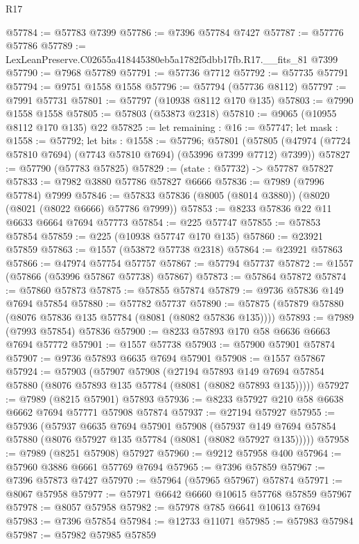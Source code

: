 \begin{lexlean}{R17}
\begin{coremodule}
@57784 := @57783 @7399
@57786 := @7396 @57784 @7427
@57787 := @57776 @57786
@57789 := LexLeanPreserve.C02655a418445380eb5a1782f5dbb17fb.R17.__fits_81 @7399
@57790 := @7968 @57789
@57791 := @57736 @7712
@57792 := @57735 @57791
@57794 := @9751 @1558 @1558
@57796 := @57794 (@57736 @8112)
@57797 := @7991 @57731
@57801 := @57797 (@10938 @8112 @170 @135)
@57803 := @7990 @1558 @1558
@57805 := @57803 (@53873 @2318)
@57810 := @9065 (@10955 @8112 @170 @135) @22
@57825 := let remaining : @16 := @57747;
  let mask : @1558 := @57792;
  let bits : @1558 := @57796;
  @57801 (@57805 (@47974 (@7724 @57810 @7694) (@7743 @57810 @7694) (@53996 @7399 @7712) @7399))
@57827 := @57790 (@57783 @57825)
@57829 := (state : @57732) -> @57787 @57827
@57833 := @7982 @3880 @57786 @57827 @6666
@57836 := @7989 (@7996 @57784) @7999
@57846 := @57833 @57836 (@8005 (@8014 @3880)) (@8020 (@8021 (@8022 @6666) @57786 @7999))
@57853 := @8233 @57836 @22 @11 @6633 @6664 @7694 @57773
@57854 := @225 @57747
@57855 := @57853 @57854
@57859 := @225 (@10938 @57747 @170 @135)
@57860 := @23921 @57859
@57863 := @1557 (@53872 @57738 @2318)
@57864 := @23921 @57863
@57866 := @47974 @57754 @57757
@57867 := @57794 @57737
@57872 := @1557 (@57866 (@53996 @57867 @57738) @57867)
@57873 := @57864 @57872
@57874 := @57860 @57873
@57875 := @57855 @57874
@57879 := @9736 @57836 @149 @7694 @57854
@57880 := @57782 @57737
@57890 := @57875 (@57879 @57880 (@8076 @57836 @135 @57784 (@8081 (@8082 @57836 @135))))
@57893 := @7989 (@7993 @57854) @57836
@57900 := @8233 @57893 @170 @58 @6636 @6663 @7694 @57772
@57901 := @1557 @57738
@57903 := @57900 @57901 @57874
@57907 := @9736 @57893 @6635 @7694 @57901
@57908 := @1557 @57867
@57924 := @57903
    (@57907
      @57908
      (@27194
        @57893
        @149
        @7694
        @57854
        @57880
        (@8076 @57893 @135 @57784 (@8081 (@8082 @57893 @135)))))
@57927 := @7989 (@8215 @57901) @57893
@57936 := @8233 @57927 @210 @58 @6638 @6662 @7694 @57771 @57908 @57874
@57937 := @27194 @57927
@57955 := @57936
    (@57937
      @6635
      @7694
      @57901
      @57908
      (@57937 @149 @7694 @57854 @57880 (@8076 @57927 @135 @57784 (@8081 (@8082 @57927 @135)))))
@57958 := @7989 (@8251 @57908) @57927
@57960 := @9212 @57958 @400
@57964 := @57960 @3886 @6661 @57769 @7694
@57965 := @7396 @57859
@57967 := @7396 @57873 @7427
@57970 := @57964 (@57965 @57967) @57874
@57971 := @8067 @57958
@57977 := @57971 @6642 @6660 @10615 @57768 @57859 @57967
@57978 := @8057 @57958
@57982 := @57978 @785 @6641 @10613 @7694
@57983 := @7396 @57854
@57984 := @12733 @11071
@57985 := @57983 @57984
@57987 := @57982 @57985 @57859

\end{coremodule}
\end{lexlean}
